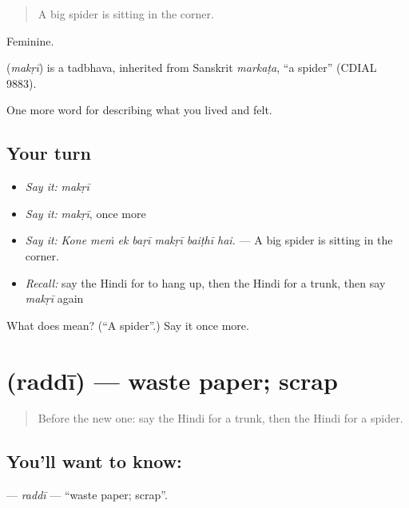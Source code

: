 \begin{quote}
A big spider is sitting in the corner.
\end{quote}

Feminine.

\begin{cousinweb}
\textbf{} (\emph{makṛī}) is a tadbhava, inherited from Sanskrit \emph{markaṭa}, \textquotedblleft{}a spider\textquotedblright{} (CDIAL 9883).
\end{cousinweb}

\begin{grammarlens}[title={What you've built}]
One more word for describing what you lived and felt.
\end{grammarlens}

\subsection*{Your turn}
\begin{itemize}
\raggedright
  \item \emph{Say it:} \emph{makṛī}
  \item \emph{Say it:} \emph{makṛī}, once more
  \item \emph{Say it:} \emph{Kone meṁ ek baṛī makṛī baiṭhī hai.} — A big spider is sitting in the corner.
  \item \emph{Recall:} say the Hindi for to hang up, then the Hindi for a trunk, then say \emph{makṛī} again
\end{itemize}

\begin{tcolorbox}[breakable,colback=teal!4,colframe=teal!35!black,title={Before you move on}]
What does  mean? (\textquotedblleft{}A spider\textquotedblright{}.) Say it once more.
\end{tcolorbox}
\section[\texorpdfstring{\hi{रद्दी} (raddī)}{रद्दी (raddī)}]{ (raddī) — waste paper; scrap}

\label{lesson:HI-C519-raddi}



\begin{quote}
Before the new one: say the Hindi for a trunk, then the Hindi for a spider.
\end{quote}

\subsection*{You'll want to know: }
\textbf{} — \emph{raddī} — \textquotedblleft{}waste paper; scrap\textquotedblright{}.

